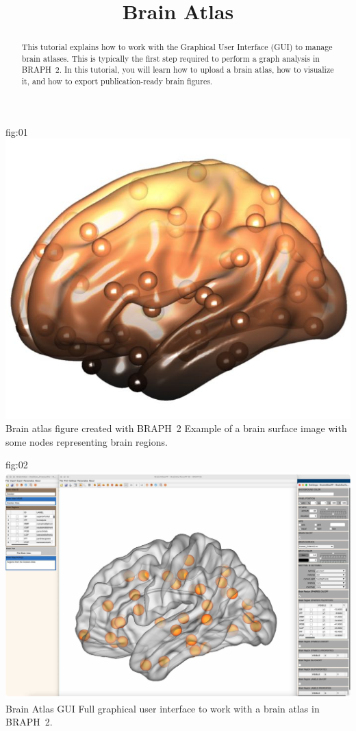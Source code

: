 \documentclass[justified]{tufte-handout}
\title{Brain Atlas}
\begin{document}
\maketitle

	{fig:01}
	{\includegraphics{fig01.jpg}}
	{Brain atlas figure created with BRAPH~2}
	{
	Example of a brain surface image with some nodes representing brain regions.
	}

\begin{abstract}
\noindent
This tutorial explains how to work with the Graphical User Interface (GUI) to manage brain atlases.
This is typically the first step required to perform a graph analysis in BRAPH~2. 
In this tutorial, you will learn how to upload a brain atlas, how to visualize it, and how to export publication-ready brain figures.
\end{abstract}


\tableofcontents


	{fig:02}
	{\includegraphics{fig02.jpg}}
	{Brain Atlas GUI}
	{
	Full graphical user interface to work with a brain atlas in BRAPH~2. 
	}
\end{document}
